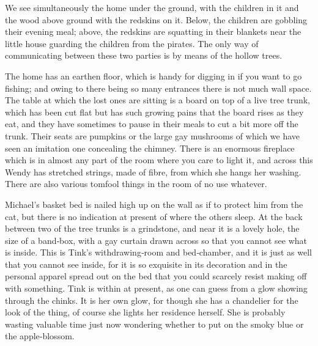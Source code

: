

\begin{stagedir}
We see simultaneously the home under the ground, with the children in it
and the wood above ground with the redskins on it.
Below, the children are gobbling their evening meal;
above, the redskins are squatting in their blankets near the little house guarding the children from the pirates.
The only way of communicating between these two parties is by means of the hollow trees.

The home has an earthen floor, which is handy for digging in if you want to go fishing;
and owing to there being so many entrances there is not much wall space.
The table at which the lost ones are sitting is a board on top of a live tree trunk,
which has been cut flat but has such growing pains that the board rises as they eat,
and they have sometimes to pause in their meals to cut a bit more off the trunk.
Their seats are pumpkins or the large gay mushrooms of which we have seen an imitation one concealing the chimney.
There is an enormous fireplace which is in almost any part of the room where you care to light it,
and across this Wendy has stretched strings, made of fibre, from which she hangs her washing.
There are also various tomfool things in the room of no use whatever.

Michael’s basket bed is nailed high up on the wall as if to protect him from the cat,
but there is no indication at present of where the others sleep.
At the back between two of the tree trunks is a grindstone,
and near it is a lovely hole, the size of a band‐box,
with a gay curtain drawn across so that you cannot see what is inside.
This is Tink’s withdrawing‐room and bed‐chamber, and it is just as well that you cannot see inside,
for it is so exquisite in its decoration and in the personal apparel spread out on the bed
that you could scarcely resist making off with something.
Tink is within at present, as one can guess from a glow showing through the chinks.
It is her own glow, for though she has a chandelier for the look of the thing, of course she lights her residence herself.
She is probably wasting valuable time just now wondering whether to put on the smoky blue or the apple‐blossom.


\end{stagedir}
